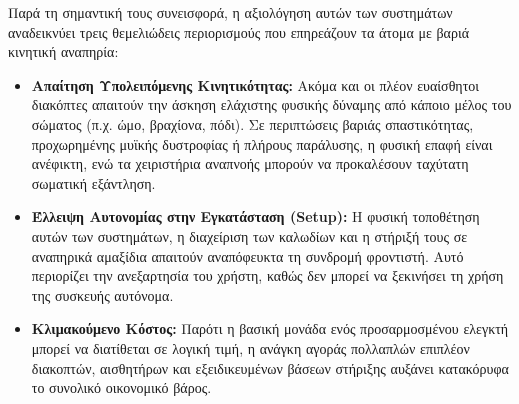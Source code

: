 \documentclass[twoside, a4paper, 11pt]{article}
\begin{document}
Παρά τη σημαντική τους συνεισφορά, η αξιολόγηση αυτών των συστημάτων αναδεικνύει τρεις θεμελιώδεις περιορισμούς που επηρεάζουν τα άτομα με βαριά κινητική αναπηρία:
\begin{itemize}
    \item \textbf{Απαίτηση Υπολειπόμενης Κινητικότητας:} Ακόμα και οι πλέον ευαίσθητοι διακόπτες απαιτούν την άσκηση ελάχιστης φυσικής δύναμης από κάποιο μέλος του σώματος (π.χ. ώμο, βραχίονα, πόδι). Σε περιπτώσεις βαριάς σπαστικότητας, προχωρημένης μυϊκής δυστροφίας ή πλήρους παράλυσης, η φυσική επαφή είναι ανέφικτη, ενώ τα χειριστήρια αναπνοής μπορούν να προκαλέσουν ταχύτατη σωματική εξάντληση.
    \item \textbf{Έλλειψη Αυτονομίας στην Εγκατάσταση (Setup):} Η φυσική τοποθέτηση αυτών των συστημάτων, η διαχείριση των καλωδίων και η στήριξή τους σε αναπηρικά αμαξίδια απαιτούν αναπόφευκτα τη συνδρομή φροντιστή. Αυτό περιορίζει την ανεξαρτησία του χρήστη, καθώς δεν μπορεί να ξεκινήσει τη χρήση της συσκευής αυτόνομα.
    \item \textbf{Κλιμακούμενο Κόστος:} Παρότι η βασική μονάδα ενός προσαρμοσμένου ελεγκτή μπορεί να διατίθεται σε λογική τιμή, η ανάγκη αγοράς πολλαπλών επιπλέον διακοπτών, αισθητήρων και εξειδικευμένων βάσεων στήριξης αυξάνει κατακόρυφα το συνολικό οικονομικό βάρος.
\end{itemize}
\end{document}
